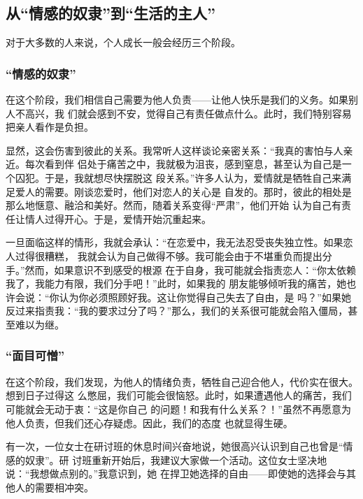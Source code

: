\documentclass{ctexart}
\begin{document}
\subsection{从``情感的奴隶''到``生活的主人''}

对于大多数的人来说，个人成长一般会经历三个阶段。

\begingroup

\renewcommand{\thesubsubsection}{第\chinese{subsubsection}阶段：}

\subsubsection{``情感的奴隶''}

在这个阶段，我们相信自己需要为他人负责------让他人快乐是我们的义务。如果别人不高兴，我
们就会感到不安，觉得自己有责任做点什么。此时，我们特别容易把亲人看作是负担。

显然，这会伤害到彼此的关系。我常听人这样谈论亲密关系：``我真的害怕与人亲近。每次看到伴
侣处于痛苦之中，我就极为沮丧，感到窒息，甚至认为自己是一个囚犯。于是，我就想尽快摆脱这
段关系。''许多人认为，爱情就是牺牲自己来满足爱人的需要。刚谈恋爱时，他们对恋人的关心是
自发的。那时，彼此的相处是那么地惬意、融洽和美好。然而，随着关系变得``严肃''，他们开始
认为自己有责任让情人过得开心。于是，爱情开始沉重起来。

一旦面临这样的情形，我就会承认：``在恋爱中，我无法忍受丧失独立性。如果恋人过得很糟糕，
我就会认为自己做得不够。我可能会由于不堪重负而提出分手。''然而，如果意识不到感受的根源
在于自身，我可能就会指责恋人：``你太依赖我了，我能力有限，我们分手吧！''此时，如果我的
朋友能够倾听我的痛苦，她也许会说：``你认为你必须照顾好我。这让你觉得自己失去了自由，是
吗？''如果她反过来指责我：``我的要求过分了吗？''那么，我们的关系很可能就会陷入僵局，甚
至难以为继。

\subsubsection{``面目可憎''}

在这个阶段，我们发现，为他人的情绪负责，牺牲自己迎合他人，代价实在很大。想到日子过得这
么憋屈，我们可能会很恼怒。此时，如果遭遇他人的痛苦，我们可能就会无动于衷：``这是你自己
的问题！和我有什么关系？！''虽然不再愿意为他人负责，但我们还心存疑虑。因此，我们的态度
也就显得生硬。

有一次，一位女士在研讨班的休息时间兴奋地说，她很高兴认识到自己也曾是``情感的奴隶''。研
讨班重新开始后，我建议大家做一个活动。这位女士坚决地说：``我想做点别的。''我意识到，她
在捍卫她选择的自由------即使她的选择会与其他人的需要相冲突。
\end{document}
